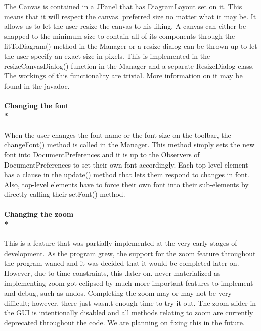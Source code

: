 \hspace{-10pt} The Canvas is contained in a JPanel that has DiagramLayout set on it. This means that it will respect the canvas. preferred size no matter what it may be. It allows us to let the user resize the canvas to his liking. A canvas can either be snapped to the minimum size to contain all of its components through the fitToDiagram() method in the Manager or a resize dialog can be thrown up to let the user specify an exact size in pixels. This is implemented in the resizeCanvasDialog() function in the Manager and a separate ResizeDialog class.  The workings of this functionality are trivial. More information on it may be found in the javadoc. 


\vspace{-5pt}\paragraph{\small{\tab Changing the font\\*}}

\hspace{-10pt}When the user changes the font name or the font size on the toolbar, the changeFont() method is called in the Manager. This method simply sets the new font into DocumentPreferences and it is up to the Observers of DocumentPreferences to set their own font accordingly. Each top-level element has a clause in the update() method that lets them respond to changes in font. Also, top-level elements have to force their own font into their sub-elements by directly calling their setFont() method.

\vspace{-5pt}\paragraph{\small{\tab Changing the zoom\\*}}

\hspace{-10pt}This is a feature that was partially implemented at the very early stages of development. As the program grew, the support for the zoom feature throughout the program waned and it was decided that it would be completed later on. However, due to time constraints, this .later on. never materialized as implementing zoom got eclipsed by much more important features to implement and debug, such as undos. Completing the zoom may or may not be very difficult; however, there just wasn.t enough time to try it out. The zoom slider in the GUI is intentionally disabled and all methods relating to zoom are currently deprecated throughout the code. We are planning on fixing this in the future.
